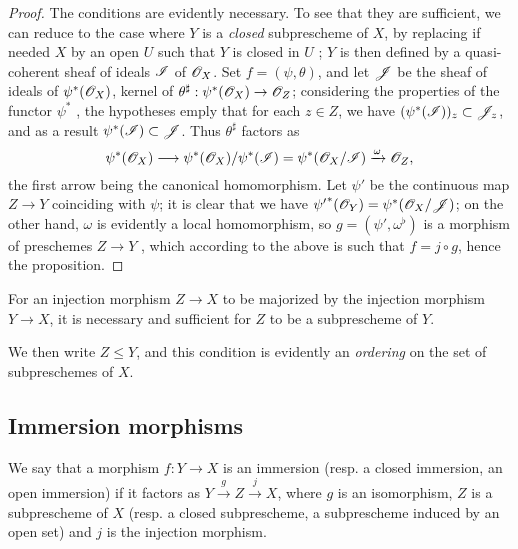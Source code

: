 \begin{proof}
\label{proof-1.4.1.9}
The conditions are evidently necessary.
To see that they are sufficient, we can reduce to the case where $Y$ is a \emph{closed} subprescheme of $X$, by replacing if needed $X$ by an open $U$ such that $Y$ is closed in $U$ ; $Y$ is then defined by a quasi-coherent sheaf of ideals $\mathscr{I}$ of $\mathscr{O}_X$.
Set $f=(\psi,\theta)$, and let $\mathscr{J}$ be the sheaf of ideals of $\psi^*(\mathscr{O}_X)$, kernel of $\theta^\sharp:\psi^*(\OO_X)\to\OO_Z$; considering the properties of the functor $\psi^*$ , the hypotheses emply that for each $z\in Z$, we have $(\psi^*(\mathscr{I}))_z\subset\mathscr{J}_z$, and as a result $\psi^*(\mathscr{I})\subset\mathscr{J}$.
Thus $\theta^\sharp$ factors as
\[
  \psi^*(\OO_X)\to\psi^*(\OO_X)/\psi^*(\sh{I})=\psi^*(\OO_X/\sh{I})\xrightarrow{\omega}\OO_Z,
\]
the first arrow being the canonical homomorphism.
Let $\psi'$ be the continuous map $Z\to Y$ coinciding with $\psi$; it is clear that we have ${\psi'}^*(\mathscr{O}_Y)=\psi^*(\mathscr{O}_X/\mathscr{J})$; on the other hand, $\omega$ is evidently a local homomorphism, so $g=(\psi',\omega^\flat)$ is a morphism
of preschemes $Z\to Y$ , which according to the above is such that $f=j\circ g$, hence the proposition.
\end{proof}

\begin{cor}[4.1.10]
\label{1.4.1.10}
For an injection morphism $Z\to X$ to be majorized by the injection morphism $Y\to X$, it is necessary and sufficient for $Z$ to be a subprescheme of $Y$.
\end{cor}

We then write $Z\leqslant Y$, and this condition is evidently an \emph{ordering} on the set of subpreschemes of $X$.

\subsection{Immersion morphisms}
\label{subsection-immersion-morphisms}

\begin{defn}[4.2.1]
\label{1.4.2.1}
We say that a morphism $f:Y\to X$ is an immersion (resp. a closed immersion, an open immersion) if it factors as $Y\xrightarrow{g}Z\xrightarrow{j}X$, where $g$ is an isomorphism, $Z$ is a subprescheme of $X$ (resp. a closed subprescheme, a subprescheme induced by an open set) and $j$ is the injection morphism.
\end{defn}

